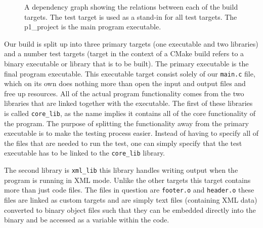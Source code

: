 \begin{figure}[ht!]
    \centering
    \caption{A dependency graph showing the relations between each of the build targets. The test target is used as a stand-in for all test targets. The p1\_project is the main program executable.}
    \label{fig:BuildGraph}
\end{figure}

Our build is split up into three primary targets (one executable and two libraries) and a number test targets (target in the context of a CMake build refers to a binary executable or library that is to be built). The primary executable is the final program executable. This executable target consist solely of our \verb|main.c| file, which on its own does nothing more than open the input and output files and free up resources. All of the actual program functionality comes from the two libraries that are linked together with the executable. The first of these libraries is called \verb|core_lib|, as the name implies it contains all of the core functionality of the program. The purpose of splitting the functionality away from the primary executable is to make the testing process easier. Instead of having to specify all of the files that are needed to run the test, one can simply specify that the test executable has to be linked to the \verb|core_lib| library.

The second library is \verb|xml_lib| this library handles writing output when the program is running in XML mode. Unlike the other targets this target contains more than just code files. The files in question are \verb|footer.o| and \verb|header.o| these files are linked as custom targets and are simply text files (containing XML data) converted to binary object files such that they can be embedded directly into the binary and be accessed as a variable within the code.

